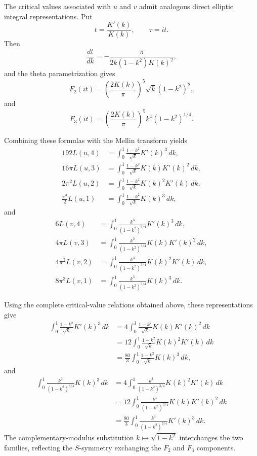 \documentclass[preprint,12pt]{elsarticle}
\theoremstyle{definition}
\theoremstyle{remark}
\begin{document}
The critical values associated with $u$ and $v$ admit analogous direct elliptic integral representations.  Put
\[
t=\frac{K'(k)}{K(k)},\qquad \tau=it.
\]
Then
\[
\frac{dt}{dk}=-\frac{\pi}{2k(1-k^2)K(k)^2},
\]
and the theta parametrization gives
\[
F_2(it)=\left(\frac{2K(k)}{\pi}\right)^5\sqrt{k}(1-k^2)^2,
\]
and
\[
F_3(it)=\left(\frac{2K(k)}{\pi}\right)^5k^4(1-k^2)^{1/4}.
\]


	Combining these formulas with the Mellin transform yields
	\begin{align*}
		192L(u,4)&=\int_0^1\frac{1-k^2}{\sqrt{k}}K'(k)^3\,dk,\\
		16\pi L(u,3)&=\int_0^1\frac{1-k^2}{\sqrt{k}}K(k)K'(k)^2\,dk,\\
		2\pi^2L(u,2)&=\int_0^1\frac{1-k^2}{\sqrt{k}}K(k)^2K'(k)\,dk,\\
		\frac{\pi^3}{2}L(u,1)&=\int_0^1\frac{1-k^2}{\sqrt{k}}K(k)^3\,dk,
	\end{align*}
	and
	\begin{align*}
		6L(v,4)&=\int_0^1\frac{k^3}{(1-k^2)^{3/4}}K'(k)^3\,dk,\\
		4\pi L(v,3)&=\int_0^1\frac{k^3}{(1-k^2)^{3/4}}K(k)K'(k)^2\,dk,\\
		4\pi^2L(v,2)&=\int_0^1\frac{k^3}{(1-k^2)^{3/4}}K(k)^2K'(k)\,dk,\\
		8\pi^3L(v,1)&=\int_0^1\frac{k^3}{(1-k^2)^{3/4}}K(k)^3\,dk.
	\end{align*}
	
Using the complete critical-value relations obtained above, these representations give
\[
\begin{aligned}
	\int_0^1 \frac{1-k^2}{\sqrt{k}}K'(k)^3\,dk
	&=4\int_0^1 \frac{1-k^2}{\sqrt{k}}K(k)K'(k)^2\,dk\\
	&=12\int_0^1 \frac{1-k^2}{\sqrt{k}}K(k)^2K'(k)\,dk\\
	&=\frac{80}{3}\int_0^1 \frac{1-k^2}{\sqrt{k}}K(k)^3\,dk,
\end{aligned}
\]
and
\[
\begin{aligned}
	\int_0^1 \frac{k^3}{(1-k^2)^{3/4}}K(k)^3\,dk
	&=4\int_0^1 \frac{k^3}{(1-k^2)^{3/4}}K(k)^2K'(k)\,dk\\
	&=12\int_0^1 \frac{k^3}{(1-k^2)^{3/4}}K(k)K'(k)^2\,dk\\
	&=\frac{80}{3}\int_0^1 \frac{k^3}{(1-k^2)^{3/4}}K'(k)^3\,dk.
\end{aligned}
\]
The complementary-modulus substitution $k\mapsto \sqrt{1-k^2}$ interchanges
the two families, reflecting the $S$-symmetry exchanging the $F_2$ and $F_3$
components.
\end{document}
